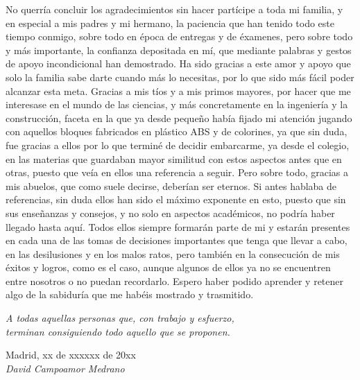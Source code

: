 No querría concluir los agradecimientos sin hacer partícipe a toda mi familia, y en especial a mis padres y mi hermano, la paciencia que han tenido todo este tiempo conmigo, sobre todo en época de entregas y de éxamenes, pero sobre todo y más importante, la confianza depositada en mí, que mediante palabras y gestos de apoyo incondicional han demostrado. Ha sido gracias a este amor y apoyo que solo la familia sabe darte cuando más lo necesitas, por lo que sido más fácil poder alcanzar esta meta. Gracias a mis tíos y a mis primos mayores, por hacer que me interesase en el mundo de las ciencias, y más concretamente en la ingeniería y la construcción, faceta en la que ya desde pequeño había fijado mi atención jugando con aquellos bloques fabricados en plástico ABS y de colorines, ya que sin duda, fue gracias a ellos por lo que terminé de decidir embarcarme, ya desde el colegio, en las materias que guardaban mayor similitud con estos aspectos antes que en otras, puesto que veía en ellos una referencia a seguir. Pero sobre todo, gracias a mis abuelos, que como suele decirse, deberían ser eternos. Si antes hablaba de referencias, sin duda ellos han sido el máximo exponente en esto, puesto que sin sus enseñanzas y consejos, y no solo en aspectos académicos, no podría haber llegado hasta aquí. Todos ellos siempre formarán parte de mi y estarán presentes en cada una de las tomas de decisiones importantes que tenga que llevar a cabo, en las desilusiones y en los malos ratos, pero también en la consecución de mis éxitos y logros, como es el caso, aunque algunos de ellos ya no se encuentren entre nosotros o no puedan recordarlo. Espero haber podido aprender y retener algo de la sabiduría que me habéis mostrado y trasmitido.\\

\begin{flushright}
		\emph{A todas aquellas personas que, con trabajo y esfuerzo,\\
 terminan consiguiendo todo aquello que se proponen.}\\
		\par
		\vspace{1.0 cm}
		Madrid, xx de xxxxxx de 20xx\\ %
		\emph{David Campoamor Medrano}
\end{flushright}

\thispagestyle{empty}

